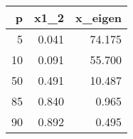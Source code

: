 
\begin{tabular}{rrr}
\toprule
p & x1\_2 & x\_eigen\\
\midrule
5 & 0.041 & 74.175\\
10 & 0.091 & 55.700\\
50 & 0.491 & 10.487\\
85 & 0.840 & 0.965\\
90 & 0.892 & 0.495\\
\bottomrule
\end{tabular}
